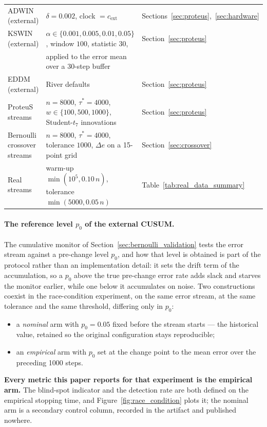 \begin{table}[t]
\begin{tabular}{@{}p{}p{}p{}@{}}
    ADWIN (external) & $\delta = 0.002$, clock $= c_{\mathrm{ext}}$ & Sections~\ref{sec:proteus},~\ref{sec:hardware} \\
    KSWIN (external) & $\alpha \in \{0.001, 0.005, 0.01, 0.05\}$, window $100$, statistic $30$, & Section~\ref{sec:proteus} \\
                     & applied to the error mean over a 30-step buffer & \\
    EDDM (external) & River defaults & Section~\ref{sec:proteus} \\
    \midrule
    ProteuS streams & $n = 8000$, $\tau^* = 4000$, $w \in \{100, 500, 1000\}$, Student-$t_7$ innovations & Section~\ref{sec:proteus} \\
    Bernoulli crossover streams & $n = 8000$, $\tau^* = 4000$, tolerance $1000$, $\Delta e$ on a 15-point grid & Section~\ref{sec:crossover} \\
    Real streams & warm-up $\min(10^5, 0.10\,n)$, tolerance $\min(5000, 0.05\,n)$ & Table~\ref{tab:real_data_summary} \\
    \bottomrule
  \end{tabular}
\end{table}

\paragraph{The reference level $p_0$ of the external CUSUM.}
The cumulative monitor of Section~\ref{sec:bernoulli_validation} tests the error stream against a
pre-change level $p_0$, and how that level is obtained is part of the protocol rather than an
implementation detail: it sets the drift term of the accumulation, so a $p_0$ above the true
pre-change error rate adds slack and starves the monitor earlier, while one below it accumulates on
noise. Two constructions coexist in the race-condition experiment, on the same error stream, at the
same tolerance and the same threshold, differing only in $p_0$:

\begin{itemize}
  \item a \emph{nominal} arm with $p_0 = 0.05$ fixed before the stream starts --- the historical
        value, retained so the original configuration stays reproducible;
  \item an \emph{empirical} arm with $p_0$ set at the change point to the mean error over the
        preceding 1000 steps.
\end{itemize}

\textbf{Every metric this paper reports for that experiment is the empirical arm.} The blind-spot
indicator and the detection rate are both defined on the empirical stopping time, and Figure~\ref{fig:race_condition} plots
it; the nominal arm is a secondary control column, recorded in the artifact and published nowhere.

